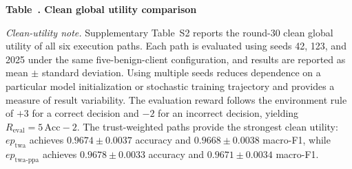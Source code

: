 \documentclass{article}
\begin{document}
\begin{center}
\label{tab:global_utility_comparison}
\textbf{Table~\thetable. Clean global utility comparison}

\end{center}

\noindent\textit{Clean-utility note.}
Supplementary Table~S2 reports the round-30 clean global utility of all six
execution paths. Each path is evaluated using seeds 42, 123, and 2025 under
the same five-benign-client configuration, and results are reported as
mean $\pm$ standard deviation. Using multiple seeds reduces dependence on
a particular model initialization or stochastic training trajectory and
provides a measure of result variability.
The evaluation reward follows the environment rule of $+3$ for a correct
decision and $-2$ for an incorrect decision, yielding
$R_{\mathrm{eval}}=5\,\mathrm{Acc}-2$. The trust-weighted paths provide the
strongest clean utility: $ep_{\mathrm{twa}}$ achieves
$0.9674\pm0.0037$ accuracy and $0.9668\pm0.0038$ macro-F1, while
$ep_{\mathrm{twa\text{-}ppa}}$ achieves
$0.9678\pm0.0033$ accuracy and $0.9671\pm0.0034$ macro-F1.
\end{document}
